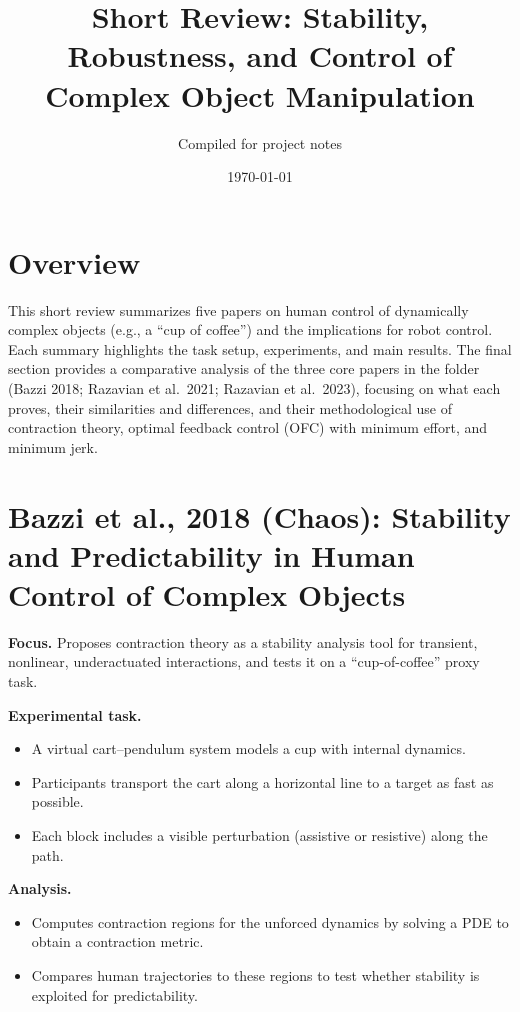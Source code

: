 \documentclass[11pt]{article}
\title{Short Review: Stability, Robustness, and Control of Complex Object Manipulation}
\author{Compiled for project notes}
\date{\today}
\begin{document}
\maketitle

\section*{Overview}
This short review summarizes five papers on human control of dynamically complex objects (e.g., a ``cup of coffee'') and the implications for robot control. Each summary highlights the task setup, experiments, and main results. The final section provides a comparative analysis of the three core papers in the folder (Bazzi 2018; Razavian et al.\ 2021; Razavian et al.\ 2023), focusing on what each proves, their similarities and differences, and their methodological use of contraction theory, optimal feedback control (OFC) with minimum effort, and minimum jerk.

\section{Bazzi et al., 2018 (Chaos): Stability and Predictability in Human Control of Complex Objects}
\textbf{Focus.} Proposes contraction theory as a stability analysis tool for transient, nonlinear, underactuated interactions, and tests it on a ``cup-of-coffee'' proxy task.

\textbf{Experimental task.}
\begin{itemize}[leftmargin=1.2em]
  \item A virtual cart--pendulum system models a cup with internal dynamics.
  \item Participants transport the cart along a horizontal line to a target as fast as possible.
  \item Each block includes a visible perturbation (assistive or resistive) along the path.
\end{itemize}

\textbf{Analysis.}
\begin{itemize}[leftmargin=1.2em]
  \item Computes contraction regions for the unforced dynamics by solving a PDE to obtain a contraction metric.
  \item Compares human trajectories to these regions to test whether stability is exploited for predictability.
\end{itemize}
\end{document}
